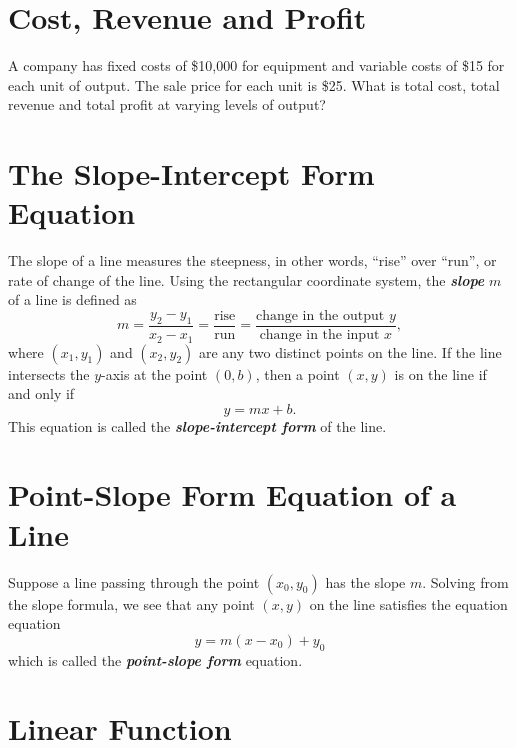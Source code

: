 \documentclass[
  en,11pt]{elegantbook}
\newcommand{\size}[2]{{\fontsize{#1}{0}\selectfont#2}}
\newenvironment{rmdthink}{
	\vspace*{0.5\baselineskip}
	\par\noindent
	\makebox[-4pt][r]{\color{green!90}\size{12}{\faLightbulbO}\,\,}
    \begin{tcolorbox}[
    enhanced,
    title={\textbf{\color{second}Think}},
    title style={left color=blue!10!green!20!white,right color=yellow!20!blue!20!white},
    colback=green!20!white,
    ]
    \sffamily
}{
    \end{tcolorbox}
	\par\ignorespacesafterend
}
\begin{document}
\hypertarget{cost-revenue-and-profit}{%
\section{Cost, Revenue and Profit}\label{cost-revenue-and-profit}}

\begin{rmdthink}

A company has fixed costs of \$10,000 for equipment and variable costs of \$15 for each unit of output. The sale price for each unit is \$25. What is total cost, total revenue and total profit at varying levels of output?

\end{rmdthink}

\hypertarget{the-slope-intercept-form-equation}{%
\section{The Slope-Intercept Form Equation}\label{the-slope-intercept-form-equation}}

The slope of a line measures the steepness, in other words, ``rise'' over ``run'', or rate of change of the line. Using the rectangular coordinate system, the \textbf{\emph{slope}} \(m\) of a line is defined as
\[
m=\dfrac{y_2-y_1}{x_2-x_1}=\dfrac{\text{rise}}{\text{run}}=\dfrac{\text{change in the output }y}{\text{change in the input } x},
\]
where \((x_1, y_1)\) and \((x_2, y_2)\) are any two distinct points on the line. If the line intersects the \(y\)-axis at the point \((0, b)\), then a point \((x, y)\) is on the line if and only if
\[
y=mx+b.
\]
This equation is called the \textbf{\emph{slope-intercept form}} of the line.

\hypertarget{point-slope-form-equation-of-a-line}{%
\section{Point-Slope Form Equation of a Line}\label{point-slope-form-equation-of-a-line}}

Suppose a line passing through the point \((x_0, y_0)\) has the slope \(m\). Solving from the slope formula, we see that any point \((x, y)\) on the line satisfies the equation equation
\[
y=m(x-x_0)+y_0
\]
which is called the \textbf{\emph{point-slope form}} equation.

\hypertarget{linear-function}{%
\section{Linear Function}\label{linear-function}}
\end{document}
